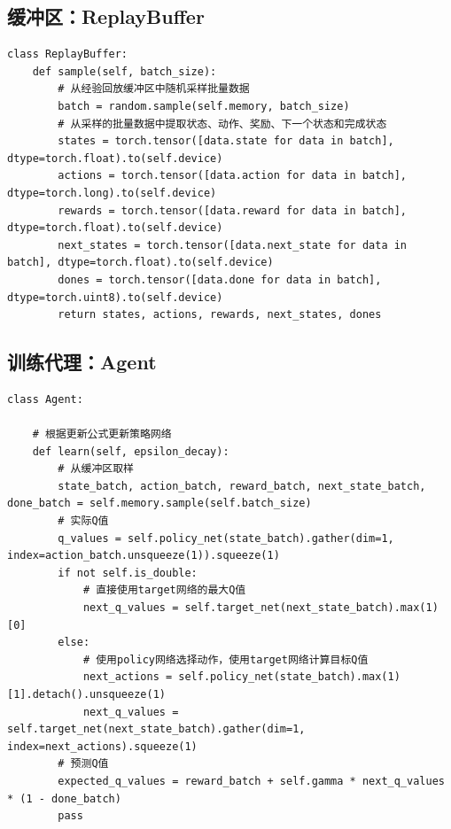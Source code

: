 \documentclass[a4paper]{ctexart}
\begin{document}
\subsection{缓冲区：ReplayBuffer}

\begin{verbatim}
class ReplayBuffer:
    def sample(self, batch_size):
        # 从经验回放缓冲区中随机采样批量数据
        batch = random.sample(self.memory, batch_size)
        # 从采样的批量数据中提取状态、动作、奖励、下一个状态和完成状态
        states = torch.tensor([data.state for data in batch], dtype=torch.float).to(self.device)
        actions = torch.tensor([data.action for data in batch], dtype=torch.long).to(self.device)
        rewards = torch.tensor([data.reward for data in batch], dtype=torch.float).to(self.device)
        next_states = torch.tensor([data.next_state for data in batch], dtype=torch.float).to(self.device)
        dones = torch.tensor([data.done for data in batch], dtype=torch.uint8).to(self.device)
        return states, actions, rewards, next_states, dones
\end{verbatim}

\subsection{训练代理：Agent}
\begin{verbatim}
class Agent:

    # 根据更新公式更新策略网络
    def learn(self, epsilon_decay):
        # 从缓冲区取样
        state_batch, action_batch, reward_batch, next_state_batch, done_batch = self.memory.sample(self.batch_size)
        # 实际Q值
        q_values = self.policy_net(state_batch).gather(dim=1, index=action_batch.unsqueeze(1)).squeeze(1)
        if not self.is_double:
            # 直接使用target网络的最大Q值
            next_q_values = self.target_net(next_state_batch).max(1)[0]
        else:
            # 使用policy网络选择动作，使用target网络计算目标Q值
            next_actions = self.policy_net(state_batch).max(1)[1].detach().unsqueeze(1)
            next_q_values = self.target_net(next_state_batch).gather(dim=1, index=next_actions).squeeze(1)
        # 预测Q值
        expected_q_values = reward_batch + self.gamma * next_q_values * (1 - done_batch)    
        pass
\end{verbatim}
\end{document}
